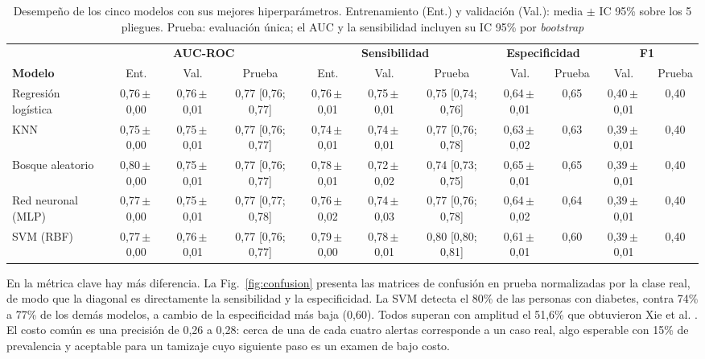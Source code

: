 \begin{table}[!t]
\centering
\caption{Desempeño de los cinco modelos con sus mejores hiperparámetros. Entrenamiento (Ent.) y validación (Val.): media $\pm$ IC 95\% sobre los 5 pliegues. Prueba: evaluación única; el AUC y la sensibilidad incluyen su IC 95\% por \textit{bootstrap}}
\label{tab:resultados}
\footnotesize
\setlength{\tabcolsep}{3.3pt}
\begin{tabular}{@{}lcccccccccc@{}}
\toprule
 & \multicolumn{3}{c}{\textbf{AUC-ROC}} & \multicolumn{3}{c}{\textbf{Sensibilidad}} & \multicolumn{2}{c}{\textbf{Especificidad}} & \multicolumn{2}{c}{\textbf{F1}} \\
\cmidrule(lr){2-4} \cmidrule(lr){5-7} \cmidrule(lr){8-9} \cmidrule(l){10-11}
\textbf{Modelo} & Ent. & Val. & Prueba & Ent. & Val. & Prueba & Val. & Prueba & Val. & Prueba \\
\midrule
Regresión logística & 0,76\,$\pm$\,0,00 & 0,76\,$\pm$\,0,01 & 0,77 [0,76; 0,77] & 0,76\,$\pm$\,0,01 & 0,75\,$\pm$\,0,01 & 0,75 [0,74; 0,76] & 0,64\,$\pm$\,0,01 & 0,65 & 0,40\,$\pm$\,0,01 & 0,40 \\
KNN & 0,75\,$\pm$\,0,00 & 0,75\,$\pm$\,0,01 & 0,77 [0,76; 0,77] & 0,74\,$\pm$\,0,01 & 0,74\,$\pm$\,0,01 & 0,77 [0,76; 0,78] & 0,63\,$\pm$\,0,02 & 0,63 & 0,39\,$\pm$\,0,01 & 0,40 \\
Bosque aleatorio & 0,80\,$\pm$\,0,00 & 0,75\,$\pm$\,0,01 & 0,77 [0,76; 0,77] & 0,78\,$\pm$\,0,01 & 0,72\,$\pm$\,0,02 & 0,74 [0,73; 0,75] & 0,65\,$\pm$\,0,01 & 0,65 & 0,39\,$\pm$\,0,01 & 0,40 \\
Red neuronal (MLP) & 0,77\,$\pm$\,0,00 & 0,75\,$\pm$\,0,01 & 0,77 [0,77; 0,78] & 0,76\,$\pm$\,0,02 & 0,74\,$\pm$\,0,03 & 0,77 [0,76; 0,78] & 0,64\,$\pm$\,0,02 & 0,64 & 0,39\,$\pm$\,0,01 & 0,40 \\
SVM (RBF) & 0,77\,$\pm$\,0,00 & 0,76\,$\pm$\,0,01 & 0,77 [0,76; 0,77] & 0,79\,$\pm$\,0,00 & 0,78\,$\pm$\,0,01 & 0,80 [0,80; 0,81] & 0,61\,$\pm$\,0,01 & 0,60 & 0,39\,$\pm$\,0,01 & 0,40 \\
\bottomrule
\end{tabular}
\end{table}

En la métrica clave hay más diferencia. La Fig.~\ref{fig:confusion} presenta las matrices de confusión en prueba normalizadas por la clase real, de modo que la diagonal es directamente la sensibilidad y la especificidad. La SVM detecta el 80\% de las personas con diabetes, contra 74\% a 77\% de los demás modelos, a cambio de la especificidad más baja (0,60). Todos superan con amplitud el 51,6\% que obtuvieron Xie et al. \cite{xie2019}. El costo común es una precisión de 0,26 a 0,28: cerca de una de cada cuatro alertas corresponde a un caso real, algo esperable con 15\% de prevalencia y aceptable para un tamizaje cuyo siguiente paso es un examen de bajo costo.

